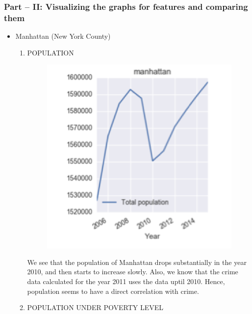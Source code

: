\documentclass{article}
\begin{document}
\subsubsection*{Part – II: Visualizing the graphs for features and comparing them}
\begin{itemize}
\item Manhattan (New York County)
\begin{enumerate}[label=(\alph*)]
\item POPULATION

\begin{figure}[H]
\centering
\includegraphics[scale=1]{ManhattanPopulation.png}
\end{figure}

We see that the population of Manhattan drops substantially in the year 2010, and then starts to increase slowly. Also, we know that the crime data calculated for the year 2011 uses the data uptil 2010. Hence, population seems to have a direct correlation with crime. 

\item POPULATION UNDER POVERTY LEVEL


\end{enumerate}
\end{itemize}
\end{document}
